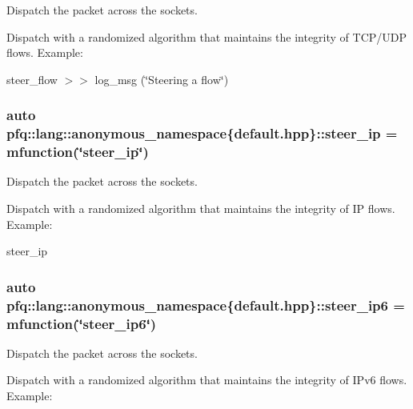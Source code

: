Dispatch the packet across the sockets. 

Dispatch with a randomized algorithm that maintains the integrity of T\+C\+P/\+U\+D\+P flows. Example\+:

steer\+\_\+flow $>$$>$ log\+\_\+msg (\char`\"{}\+Steering a flow\char`\"{}) \hypertarget{namespacepfq_1_1lang_1_1anonymous__namespace_02default_8hpp_03_afe1c69c555a75021f7e637086cb1264c}{
\subsubsection[{steer\+\_\+ip}]{\setlength{\rightskip}{0pt plus 5cm}auto pfq\+::lang\+::anonymous\+\_\+namespace\{default.\+hpp\}\+::steer\+\_\+ip = {\bf mfunction}(\char`\"{}steer\+\_\+ip\char`\"{})}}\label{namespacepfq_1_1lang_1_1anonymous__namespace_02default_8hpp_03_afe1c69c555a75021f7e637086cb1264c}


Dispatch the packet across the sockets. 

Dispatch with a randomized algorithm that maintains the integrity of I\+P flows. Example\+:

steer\+\_\+ip \hypertarget{namespacepfq_1_1lang_1_1anonymous__namespace_02default_8hpp_03_a02291b124a4aa900d78797e386517f69}{
\subsubsection[{steer\+\_\+ip6}]{\setlength{\rightskip}{0pt plus 5cm}auto pfq\+::lang\+::anonymous\+\_\+namespace\{default.\+hpp\}\+::steer\+\_\+ip6 = {\bf mfunction}(\char`\"{}steer\+\_\+ip6\char`\"{})}}\label{namespacepfq_1_1lang_1_1anonymous__namespace_02default_8hpp_03_a02291b124a4aa900d78797e386517f69}


Dispatch the packet across the sockets. 

Dispatch with a randomized algorithm that maintains the integrity of I\+Pv6 flows. Example\+:

